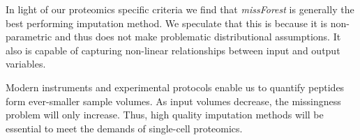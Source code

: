 \documentclass{article}
\begin{document}
In light of our proteomics specific criteria we find that \textit{missForest} is generally the best performing imputation method. We speculate that this is because it is non-parametric and thus does not make problematic distributional assumptions. It also is capable of capturing non-linear relationships between input and output variables. 

Modern instruments and experimental protocols enable us to quantify peptides form ever-smaller sample volumes. As input volumes decrease, the missingness problem will only increase. Thus, high quality imputation methods will be essential to meet the demands of single-cell proteomics. 

%

 
\end{document}
